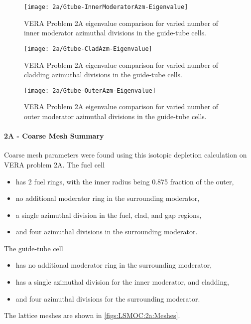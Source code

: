 {{{{{          \begin{figure}
            \centering
            \texttt{[image: 2a/Gtube-InnerModeratorAzm-Eigenvalue]}
            \caption{VERA Problem 2A eigenvalue comparison for varied number of inner moderator azimuthal divisions in the guide-tube cells. \label{fig:LSMOC:2A:Gtube:Inner Moderator Azimuthals:Eigenvalues}}
          \end{figure}
          \begin{figure}
            \centering
            \texttt{[image: 2a/Gtube-CladAzm-Eigenvalue]}
            \caption{VERA Problem 2A eigenvalue comparison for varied number of cladding azimuthal divisions in the guide-tube cells. \label{fig:LSMOC:2A:Gtube:Cladding Azimuthals:Eigenvalues}}
          \end{figure}
          \begin{figure}
            \centering
            \texttt{[image: 2a/Gtube-OuterAzm-Eigenvalue]}
            \caption{VERA Problem 2A eigenvalue comparison for varied number of outer moderator azimuthal divisions in the guide-tube cells. \label{fig:LSMOC:2A:Gtube:Outer Moderator Azimuthals:Eigenvalues}}
          \end{figure}
        }
        \paragraph{2A - Coarse Mesh Summary}{
          Coarse mesh parameters were found using this isotopic depletion calculation on \ac{VERA} problem 2A.
          The fuel cell
          \begin{itemize}
            \item{has 2 fuel rings, with the inner radius being 0.875 fraction of the outer,}
            \item{no additional moderator ring in the surrounding moderator,}
            \item{a single azimuthal division in the fuel, clad, and gap regions,}
            \item{and four azimuthal divisions in the surrounding moderator.}
          \end{itemize}
          The guide-tube cell
          \begin{itemize}
            \item{has no additional moderator ring in the surrounding moderator,}
            \item{has a single azimuthal division for the inner moderator, and cladding,}
            \item{and four azimuthal divisions for the surrounding moderator.}
          \end{itemize}
          The lattice meshes are shown in \cref{figs:LSMOC:2a:Meshes}.

}}}}}
